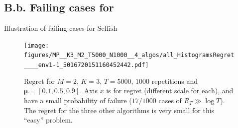 \documentclass[12pt,english,ignorenonframetext,]{beamer}
\begin{document}
\subsection{\hfill{}B.b. Failing cases for \Selfish\hfill{}}

\begin{frame}[plain]{Illustration of failing cases for
\(\mathrm{Selfish}\)}

\begin{figure}[h!]
\texttt{[image: figures/MP\_\_K3\_M2\_T5000\_N1000\_\_4\_algos/all\_HistogramsRegret\_\_\_\_env1-1\_5016720151160452442.pdf]}
\caption{\footnotesize{Regret for $M=2$, $K=3$, $T=5000$, $1000$ repetitions and $\boldsymbol{\mu} = [0.1, 0.5, 0.9]$. Axis $x$ is for regret (different scale for each), and \textcolor{bluegreen}{\Selfish{}} have a small probability of failure ($17/1000$ cases of $R_T \gg \log T$). The regret for the three other algorithms is very small for this ``easy'' problem.}}
\end{figure}

\end{frame}
\end{document}
